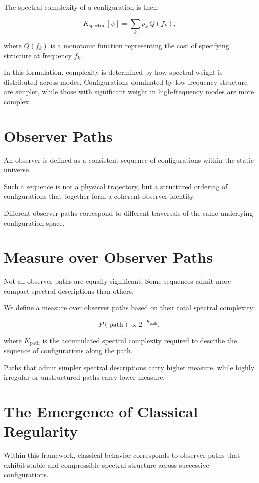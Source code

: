 The spectral complexity of a configuration is then:

\[
K_\text{spectral}[\psi] = \sum_k p_k \, Q(f_k),
\]

where $Q(f_k)$ is a monotonic function representing the cost of specifying structure at frequency $f_k$.

In this formulation, complexity is determined by how spectral weight is distributed across modes.
Configurations dominated by low-frequency structure are simpler, while those with significant weight in high-frequency modes are more complex.


\section{Observer Paths}

An observer is defined as a consistent sequence of configurations within the static universe.

Such a sequence is not a physical trajectory, but a structured ordering of configurations that together form a coherent observer identity.

Different observer paths correspond to different traversals of the same underlying configuration space.


\section{Measure over Observer Paths}

Not all observer paths are equally significant. Some sequences admit more compact spectral descriptions than others.

We define a measure over observer paths based on their total spectral complexity:

\[
P(\text{path}) \propto 2^{-K_\text{path}},
\]

where $K_\text{path}$ is the accumulated spectral complexity required to describe the sequence of configurations along the path.

Paths that admit simpler spectral descriptions carry higher measure, while highly irregular or unstructured paths carry lower measure.


\section{The Emergence of Classical Regularity}

Within this framework, classical behavior corresponds to observer paths that exhibit stable and compressible spectral structure across successive configurations.

